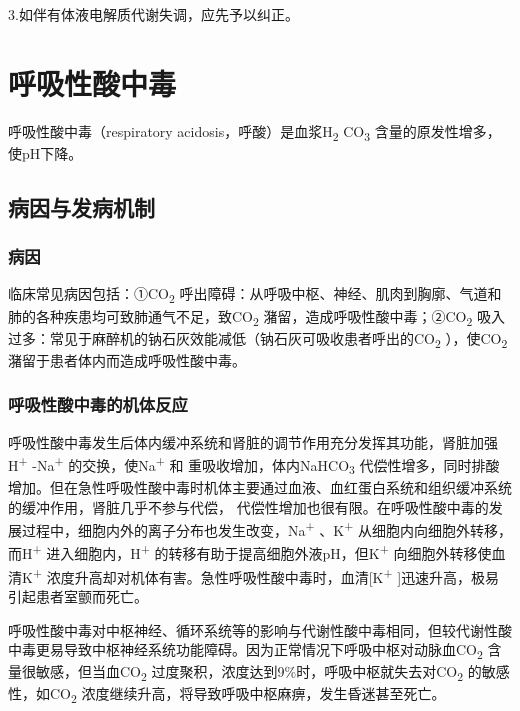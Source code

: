 3.如伴有体液电解质代谢失调，应先予以纠正。

\protect\hypertarget{text00205.html}{}{}

\section{呼吸性酸中毒}

呼吸性酸中毒（respiratory acidosis，呼酸）是血浆H\textsubscript{2}
CO\textsubscript{3} 含量的原发性增多，使pH下降。

\subsection{病因与发病机制}

\subsubsection{病因}

临床常见病因包括：①CO\textsubscript{2}
呼出障碍：从呼吸中枢、神经、肌肉到胸廓、气道和肺的各种疾患均可致肺通气不足，致CO\textsubscript{2}
潴留，造成呼吸性酸中毒；②CO\textsubscript{2}
吸入过多：常见于麻醉机的钠石灰效能减低（钠石灰可吸收患者呼出的CO\textsubscript{2}
），使CO\textsubscript{2} 潴留于患者体内而造成呼吸性酸中毒。

\subsubsection{呼吸性酸中毒的机体反应}

呼吸性酸中毒发生后体内缓冲系统和肾脏的调节作用充分发挥其功能，肾脏加强H\textsuperscript{+}
-Na\textsuperscript{+} 的交换，使Na\textsuperscript{+} 和{}
重吸收增加，体内NaHCO\textsubscript{3}
代偿性增多，同时排酸增加。但在急性呼吸性酸中毒时机体主要通过血液、血红蛋白系统和组织缓冲系统的缓冲作用，肾脏几乎不参与代偿，{}
代偿性增加也很有限。在呼吸性酸中毒的发展过程中，细胞内外的离子分布也发生改变，Na\textsuperscript{+}
、K\textsuperscript{+} 从细胞内向细胞外转移，而H\textsuperscript{+}
进入细胞内，H\textsuperscript{+}
的转移有助于提高细胞外液pH，但K\textsuperscript{+}
向细胞外转移使血清K\textsuperscript{+}
浓度升高却对机体有害。急性呼吸性酸中毒时，血清{[}K\textsuperscript{+}
{]}迅速升高，极易引起患者室颤而死亡。

呼吸性酸中毒对中枢神经、循环系统等的影响与代谢性酸中毒相同，但较代谢性酸中毒更易导致中枢神经系统功能障碍。因为正常情况下呼吸中枢对动脉血CO\textsubscript{2}
含量很敏感，但当血CO\textsubscript{2}
过度聚积，浓度达到9\%时，呼吸中枢就失去对CO\textsubscript{2}
的敏感性，如CO\textsubscript{2}
浓度继续升高，将导致呼吸中枢麻痹，发生昏迷甚至死亡。


